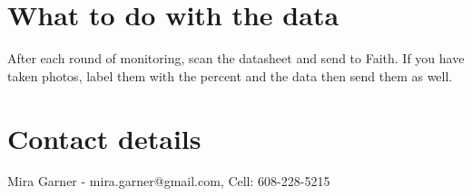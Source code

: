 \documentclass[11pt,letter]{article}
\begin{document}
\section{What to do with the data}
After each round of monitoring, scan the datasheet and send to Faith. If you have taken photos, label them with the percent and the data then send them as well.

\section{Contact details}
Mira Garner - mira.garner@gmail.com, Cell: 608-228-5215
\end{document}
